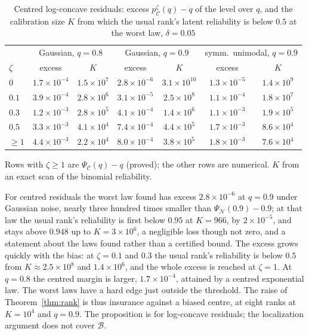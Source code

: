 \documentclass[12pt]{article}
\theoremstyle{definition}
\newcommand{\B}{\mathcal{B}}
\newcommand{\E}{\mathcal{C}}
\newcommand{\N}{\mathcal{N}}
\begin{document}
\begin{table}[htbp]
\renewcommand{\baselinestretch}{1}
\caption{Centred log-concave residuals: excess $p^\zeta_{\E}(q) - q$ of the level over $q$, and the calibration size $K$ from which the usual rank's latent reliability is below $0.5$ at the worst law, $\delta = 0.05$}
\label{tab:centred}
\centering
\fontsize{9}{11pt}\selectfont
\begin{tabular}{lcccccc}
\toprule
& \multicolumn{2}{c}{Gaussian, $q = 0.8$} & \multicolumn{2}{c}{Gaussian, $q = 0.9$} & \multicolumn{2}{c}{symm.\ unimodal, $q = 0.9$} \\
$\zeta$ & excess & $K$ & excess & $K$ & excess & $K$ \\
\midrule
$0$ & $1.7 \times 10^{-4}$ & $1.5 \times 10^{7}$ & $2.8 \times 10^{-6}$ & $3.1 \times 10^{10}$ & $1.3 \times 10^{-5}$ & $1.4 \times 10^{9}$ \\
$0.1$ & $3.9 \times 10^{-4}$ & $2.8 \times 10^{6}$ & $3.1 \times 10^{-5}$ & $2.5 \times 10^{8}$ & $1.1 \times 10^{-4}$ & $1.8 \times 10^{7}$ \\
$0.3$ & $1.2 \times 10^{-3}$ & $2.8 \times 10^{5}$ & $4.1 \times 10^{-4}$ & $1.4 \times 10^{6}$ & $1.1 \times 10^{-3}$ & $1.9 \times 10^{5}$ \\
$0.5$ & $3.3 \times 10^{-3}$ & $4.1 \times 10^{4}$ & $7.4 \times 10^{-4}$ & $4.4 \times 10^{5}$ & $1.7 \times 10^{-3}$ & $8.6 \times 10^{4}$ \\
$\ge 1$ & $4.4 \times 10^{-3}$ & $2.2 \times 10^{4}$ & $8.0 \times 10^{-4}$ & $3.8 \times 10^{5}$ & $1.8 \times 10^{-3}$ & $7.6 \times 10^{4}$ \\
\bottomrule
\end{tabular}
\par\smallskip
\parbox{\textwidth}{\fontsize{8}{10pt}\selectfont Rows with $\zeta \ge 1$ are $\Psi_{\E}(q) - q$ (proved); the other rows are numerical. $K$ from an exact scan of the binomial reliability.}
\end{table}

For centred residuals the worst law found has excess $2.8 \times 10^{-6}$ at $q = 0.9$ under Gaussian noise, nearly three hundred times smaller than $\Psi_{\N}(0.9) - 0.9$; at that law the usual rank's reliability is first below $0.95$ at $K = 966$, by $2 \times 10^{-5}$, and stays above $0.948$ up to $K = 3 \times 10^6$, a negligible loss though not zero, and a statement about the laws found rather than a certified bound. The excess grows quickly with the bias: at $\zeta = 0.1$ and $0.3$ the usual rank's reliability is below $0.5$ from $K \approx 2.5 \times 10^8$ and $1.4 \times 10^6$, and the whole excess is reached at $\zeta = 1$. At $q = 0.8$ the centred margin is larger, $1.7 \times 10^{-4}$, attained by a centred exponential law. The worst laws have a hard edge just outside the threshold. The raise of Theorem~\ref{thm:rank} is thus insurance against a biased centre, at eight ranks at $K = 10^4$ and $q = 0.9$. The proposition is for log-concave residuals; the localization argument does not cover $\B$.
\end{document}
